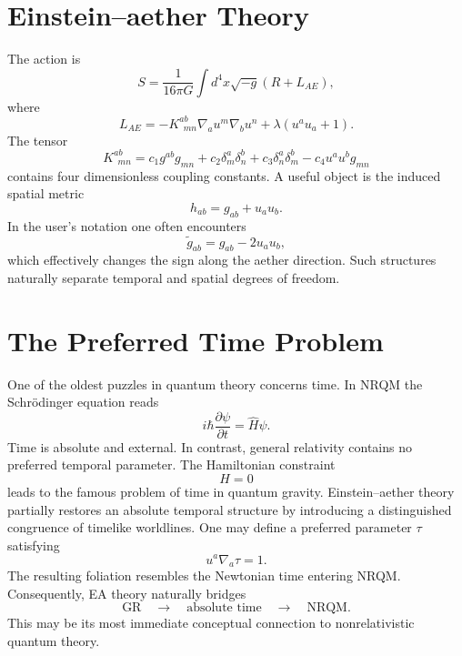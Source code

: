 \documentclass[11pt]{article}
\begin{document}
\section{Einstein--aether Theory}
The action is
\begin{equation}
S=
\frac{1}{16\pi G}
\int d^4x \sqrt{-g}
\left(
R + L_{AE}
\right),
\end{equation}
where
\begin{equation}
L_{AE}
=
-K^{ab}_{\ \ mn}
\nabla_a u^m
\nabla_b u^n
+\lambda(u^a u_a+1).
\end{equation}
The tensor
\begin{equation}
K^{ab}_{\ \ mn}
=
c_1 g^{ab}g_{mn}
+c_2\delta^a_m\delta^b_n
+c_3\delta^a_n\delta^b_m
-c_4 u^a u^b g_{mn}
\end{equation}
contains four dimensionless coupling constants.
A useful object is the induced spatial metric
\begin{equation}
h_{ab}=g_{ab}+u_a u_b .
\end{equation}
In the user's notation one often encounters
\begin{equation}
\tilde g_{ab}
=
g_{ab}-2u_a u_b ,
\end{equation}
which effectively changes the sign along the aether direction.
Such structures naturally separate temporal and spatial degrees of
freedom.
\section{The Preferred Time Problem}
One of the oldest puzzles in quantum theory concerns time.
In NRQM the Schr\"odinger equation reads
\begin{equation}
i\hbar \frac{\partial \psi}{\partial t}
=
\hat H \psi.
\end{equation}
Time is absolute and external.
In contrast, general relativity contains no preferred temporal
parameter. The Hamiltonian constraint
\begin{equation}
H=0
\end{equation}
leads to the famous problem of time in quantum gravity.
Einstein--aether theory partially restores an absolute temporal
structure by introducing a distinguished congruence of timelike
worldlines.
One may define a preferred parameter $\tau$ satisfying
\begin{equation}
u^a \nabla_a \tau =1.
\end{equation}
The resulting foliation resembles the Newtonian time entering NRQM.
Consequently, EA theory naturally bridges
\begin{equation}
\text{GR}
\quad\longrightarrow\quad
\text{absolute time}
\quad\longrightarrow\quad
\text{NRQM}.
\end{equation}
This may be its most immediate conceptual connection to
nonrelativistic quantum theory.
\end{document}
